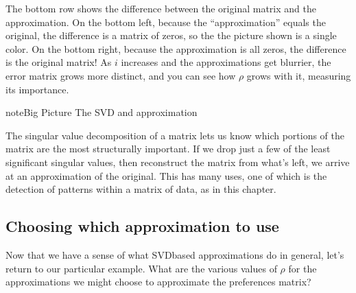 \documentclass[letterpaper,10pt,english]{jupyterBook}
\begin{document}
\sphinxAtStartPar
{}

\sphinxAtStartPar
The bottom row shows the difference between the original matrix and the approximation.  On the bottom left, because the “approximation” equals the original, the difference is a matrix of zeros, so the the picture shown is a single color.  On the bottom right, because the approximation is all zeros, the difference is the original matrix!  As \(i\) increases and the approximations get blurrier, the error matrix grows more distinct, and you can see how \(\rho\) grows with it, measuring its importance.

\begin{sphinxadmonition}{note}{Big Picture \sphinxhyphen{} The SVD and approximation}

\sphinxAtStartPar
The singular value decomposition of a matrix lets us know which portions of the matrix are the most structurally important.  If we drop just a few of the least significant singular values, then reconstruct the matrix from what’s left, we arrive at an approximation of the original.  This has many uses, one of which is the detection of patterns within a matrix of data, as in this chapter.
\end{sphinxadmonition}


\subsection{Choosing which approximation to use}
\label{\detokenize{chapter-16-matrices:choosing-which-approximation-to-use}}
\sphinxAtStartPar
Now that we have a sense of what SVD\sphinxhyphen{}based approximations do in general, let’s return to our particular example.  What are the various values of \(\rho\) for the approximations we might choose to approximate the preferences matrix?

\begin{sphinxVerbatim}[commandchars=\\\{\}]
\PYG{p}{[}           \PYG{p}{]}
\end{sphinxVerbatim}

\begin{sphinxVerbatim}[commandchars=\\\{\}]
[1.0,
 3.37690824654076e\PYGZhy{}09,
 0.3221266792969309,
 0.5422162727569354,
 0.6921213328320459,
 0.8460293400488614,
 1.0]
\end{sphinxVerbatim}
\end{document}

